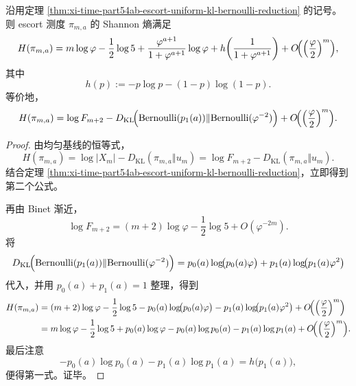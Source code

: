 \begin{theorem}\label{thm:xi-time-part54ab-escort-shannon-closed-form}
沿用定理 \ref{thm:xi-time-part54ab-escort-uniform-kl-bernoulli-reduction} 的记号。则 escort 测度 \(\pi_{m,a}\) 的 Shannon 熵满足
\[
H(\pi_{m,a})
=
m\log\varphi-\frac12\log 5
+\frac{\varphi^{a+1}}{1+\varphi^{a+1}}\log\varphi
+h\!\left(\frac{1}{1+\varphi^{a+1}}\right)
+O\!\Bigl(\Bigl(\frac{\varphi}{2}\Bigr)^m\Bigr),
\]
其中
\[
h(p):=-p\log p-(1-p)\log(1-p).
\]
等价地，
\[
H(\pi_{m,a})
=
\log F_{m+2}
-D_{\mathrm{KL}}\!\Bigl(\mathrm{Bernoulli}(p_1(a))\Vert \mathrm{Bernoulli}(\varphi^{-2})\Bigr)
+O\!\Bigl(\Bigl(\frac{\varphi}{2}\Bigr)^m\Bigr).
\]
\end{theorem}
\begin{proof}
由均匀基线的恒等式，
\[
H(\pi_{m,a})=\log|X_m|-D_{\mathrm{KL}}(\pi_{m,a}\Vert u_m)=\log F_{m+2}-D_{\mathrm{KL}}(\pi_{m,a}\Vert u_m).
\]
结合定理 \ref{thm:xi-time-part54ab-escort-uniform-kl-bernoulli-reduction}，立即得到第二个公式。

再由 Binet 渐近，
\[
\log F_{m+2}
=(m+2)\log\varphi-\frac12\log 5+O(\varphi^{-2m}).
\]
将
\[
D_{\mathrm{KL}}\!\Bigl(\mathrm{Bernoulli}(p_1(a))\Vert \mathrm{Bernoulli}(\varphi^{-2})\Bigr)
=
p_0(a)\log\!\bigl(p_0(a)\varphi\bigr)
+
p_1(a)\log\!\bigl(p_1(a)\varphi^2\bigr)
\]
代入，并用 \(p_0(a)+p_1(a)=1\) 整理，得到
\[
\begin{aligned}
H(\pi_{m,a})
&=
(m+2)\log\varphi-\frac12\log 5
-p_0(a)\log\!\bigl(p_0(a)\varphi\bigr)
-p_1(a)\log\!\bigl(p_1(a)\varphi^2\bigr)
+O\!\Bigl(\Bigl(\frac{\varphi}{2}\Bigr)^m\Bigr)\\
&=
m\log\varphi-\frac12\log 5
+p_0(a)\log\varphi
-p_0(a)\log p_0(a)-p_1(a)\log p_1(a)
+O\!\Bigl(\Bigl(\frac{\varphi}{2}\Bigr)^m\Bigr).
\end{aligned}
\]
最后注意
\[
-p_0(a)\log p_0(a)-p_1(a)\log p_1(a)=h\bigl(p_1(a)\bigr),
\]
便得第一式。证毕。
\end{proof}

\endinput
